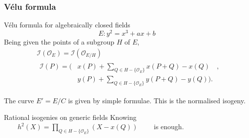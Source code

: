 \documentclass[10pt]{beamer}
\newcommand{\0}{\mathcal{O}}  %
\newcommand{\isog}[1]{\mathcal{#1}}  %
\newcommand{\I}{\isog{I}}  %
\begin{document}

\begin{frame}
  \frametitle{Vélu formula}
  
  \begin{block}{Vélu formula for algebraically closed fields}
    \[E : y^2 = x^3 + ax + b\]
    Being given the points of a subgroup $H$ of $E$,
    \begin{align*}
      &\I(\0_E) = \I(\0_{E/H})\\
      &\begin{aligned}
        \I(P) = \Biggl( &x(P) + \sum_{Q\in H - \{\0_E\}}x(P+Q) - x(Q) \quad,\\
        &y(P) + \sum_{Q\in H - \{\0_E\}}y(P+Q) - y(Q) \Biggr) \text{.}
      \end{aligned}
    \end{align*}

    The curve $E'=E/C$ is given by simple formulae. This is the
    normalised isogeny.
  \end{block}

  \begin{block}{Rational isogenies on generic fields}
    \centering Knowing $\qquad h^2(X) = \prod_{Q\in H-\{\0_E\}}\left(X
    - x(Q)\right)\qquad$ is enough.
  \end{block}
\end{frame}

\end{document}
